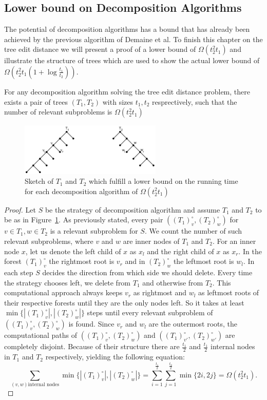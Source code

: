 \subsection{Lower bound on Decomposition Algorithms}
The potential of decomposition algorithms has a bound that has already been achieved by the previous algorithm of Demaine et al. To finish this chapter on the tree edit distance we will present a proof of a lower bound of $\Omega(t_2^2t_1)$ and illustrate the structure of trees which are used to show the actual lower bound of $\Omega(t_2^2t_1(1+\log \frac{t_1}{t_2}))$.
\begin{lem}
For any decomposition algorithm solving the tree edit distance problem,
there exists a pair of trees $(T_1,T_2)$ with sizes $t_1, t_2$ resprectively, such that the number of relevant subproblems is $\Omega(t_2^2t_1)$
\end{lem}
\begin{figure}[!ht]
	\centering
	\includegraphics[height=2.5cm]{figures/O(m^2n).JPG}
	\caption{Sketch of $T_1$ and $T_2$ which fulfill a lower bound on the running time for each decomposition algorithm of $\Omega (t_2^2t_1)$}
	\label{fig:m^2n}
\end{figure}
\begin{proof}
Let $S$ be the strategy of decomposition algorithm and assume $T_1$ and $T_2$ to be as in Figure~\ref{fig:m^2n}. As previously stated, every pair $((T_1)_v^{\circ}, (T_2)_w^{\circ})$ for $v \in T_1, w \in T_2$ is a relevant subproblem for $S$. We count the number of such relevant
subproblems, where  $v$ and $w$ are inner nodes of $T_1$ and $T_2$. For an inner node $x$, let us denote the left child of $x$ as $x_l$ and the right child of $x$ as $x_r$. In the forest $(T_1)_v^{\circ}$ the rightmost root is $v_r$ and in $(T_2)_w^{\circ}$ the leftmost root is $w_l$. In each step $S$ decides the direction from which side we should delete. Every
time the strategy chooses left, we delete from $T_1$ and otherwise from $T_2$. This computational approach always keeps $v_r$ as rightmost and $w_l$ as leftmost roots of their respective forests until they are the only nodes left. So it takes at least $\min \{|(T_1)_v^{\circ}|,|(T_2)_w^{\circ}|\}$ steps until every relevant subproblem of $((T_1)_v^{\circ}, (T_2)_w^{\circ})$ is found. Since $v_r$ and $w_l$ are the outermost roots, the computational paths of $((T_1)_v^{\circ}, (T_2)_w^{\circ})$ and $((T_1)_{v'}^{\circ}, (T_2)_{w'}^{\circ})$ are completely disjoint. Because of their structure there are $\frac{t_1}{2}$
and $\frac{t_1}{2}$ internal nodes in $T_1$ and $T_2$ respectively, yielding the following equation:
$$ \sum_{(v,w) \text{internal nodes}}\min \{|(T_1)_v^{\circ}|,|(T_2)_w^{\circ}|\} = \sum_{i=1}^{\frac{t_1}{2}} \sum_{j=1}^{\frac{t_2}{2}} \min \{2i, 2j\} = \Omega(t_2^2 t_1).$$
\end{proof}
